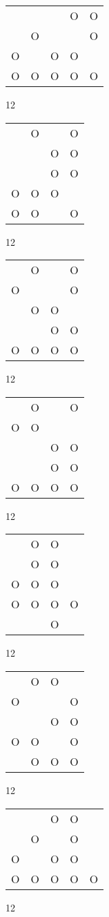 \begin{tabular}{|m{0.2cm}m{0.2cm}m{0.2cm}m{0.2cm}m{0.2cm}|}\hline
 & & &O&O\\
 &O& & &O\\
O& &O&O& \\
O&O&O&O&O\\
\hline\end{tabular}12
\begin{tabular}{|m{0.2cm}m{0.2cm}m{0.2cm}m{0.2cm}|}\hline
 &O& &O\\
 & &O&O\\
 & &O&O\\
O&O&O& \\
O&O& &O\\
\hline\end{tabular}12
\begin{tabular}{|m{0.2cm}m{0.2cm}m{0.2cm}m{0.2cm}|}\hline
 &O& &O\\
O& & &O\\
 &O&O& \\
 & &O&O\\
O&O&O&O\\
\hline\end{tabular}12
\begin{tabular}{|m{0.2cm}m{0.2cm}m{0.2cm}m{0.2cm}|}\hline
 &O& &O\\
O&O& & \\
 & &O&O\\
 & &O&O\\
O&O&O&O\\
\hline\end{tabular}12
\begin{tabular}{|m{0.2cm}m{0.2cm}m{0.2cm}m{0.2cm}|}\hline
 &O&O& \\
 &O&O& \\
O&O&O& \\
O&O&O&O\\
 & &O& \\
\hline\end{tabular}12
\begin{tabular}{|m{0.2cm}m{0.2cm}m{0.2cm}m{0.2cm}|}\hline
 &O&O& \\
O& & &O\\
 & &O&O\\
O&O& &O\\
 &O&O&O\\
\hline\end{tabular}12
\begin{tabular}{|m{0.2cm}m{0.2cm}m{0.2cm}m{0.2cm}m{0.2cm}|}\hline
 & &O&O& \\
 &O& &O& \\
O& &O&O& \\
O&O&O&O&O\\
\hline\end{tabular}12
